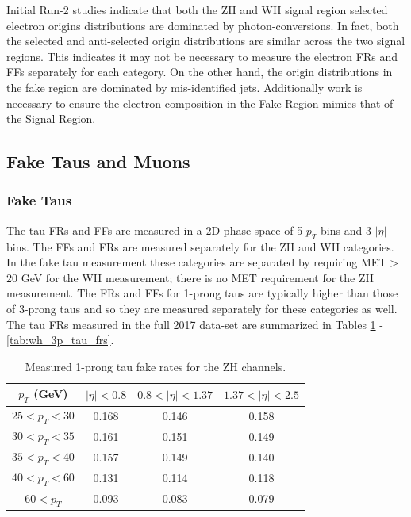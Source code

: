 \pagebreak

Initial Run-2 studies indicate that both the ZH and WH signal region selected electron origins distributions are dominated by photon-conversions. In fact, both the selected and anti-selected origin distributions are similar across the two signal regions. This indicates it may not be necessary to measure the electron FRs and FFs separately for each category. On the other hand, the origin distributions in the fake region are dominated by mis-identified jets. Additionally work is necessary to ensure the electron composition in the Fake Region mimics that of the Signal Region.

\subsection{Fake Taus and Muons}
\subsubsection{Fake Taus}
The tau FRs and FFs are measured in a 2D phase-space of 5 $p_T$ bins and 3 $|\eta|$ bins. The FFs and FRs are measured separately for the ZH and WH categories. In the fake tau measurement these categories are separated by requiring MET$>$20 GeV for the WH measurement; there is no MET requirement for the ZH measurement. The FRs and FFs for 1-prong taus are typically higher than those of 3-prong taus and so they are measured separately for these categories as well. The tau FRs measured in the full 2017 data-set are summarized in Tables \ref{tab:zh_1p_tau_frs} - \ref{tab:wh_3p_tau_frs}.\\

\begin{table}[htb!]
    \centering
    \begin{tabular}{|c|c|c|c|}
    \hline
    $p_T$ (GeV) & $|\eta|<0.8$ & $0.8<|\eta|<1.37$ & $1.37<|\eta|<2.5$\\
    \hline
    $25<p_T<30$ & 0.168 & 0.146 & 0.158\\
    $30<p_T<35$ & 0.161 & 0.151 & 0.149\\
    $35<p_T<40$ & 0.157 & 0.149 & 0.140\\
    $40<p_T<60$ & 0.131 & 0.114 & 0.118\\
    $60<p_T$ & 0.093 & 0.083 & 0.079\\
    \hline
    \end{tabular}
    \caption{Measured 1-prong tau fake rates for the ZH channels.}
    \label{tab:zh_1p_tau_frs}
\end{table}


